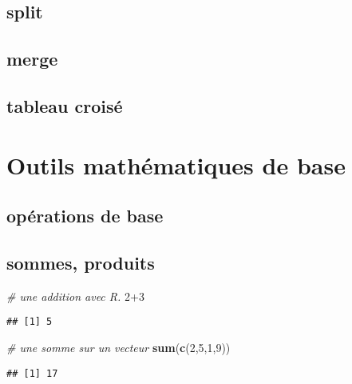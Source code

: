 \documentclass[french,]{article}
\newenvironment{Shaded}{\begin{snugshade}}{\end{snugshade}}
\newcommand{\KeywordTok}[1]{\textcolor[rgb]{0.13,0.29,0.53}{\textbf{{#1}}}}
\newcommand{\DecValTok}[1]{\textcolor[rgb]{0.00,0.00,0.81}{{#1}}}
\newcommand{\CommentTok}[1]{\textcolor[rgb]{0.56,0.35,0.01}{\textit{{#1}}}}
\newcommand{\NormalTok}[1]{{#1}}
\begin{document}
\subsection{split}\label{split}

\subsection{merge}\label{merge}

\subsection{tableau croisé}\label{tableau-croise}

\newpage

\section{Outils mathématiques de
base}\label{outils-mathematiques-de-base}

\subsection{opérations de base}\label{operations-de-base}

\subsection{sommes, produits}\label{sommes-produits}

\begin{Shaded}
\begin{Highlighting}[]
\CommentTok{# une addition avec R.}
\DecValTok{2+3}
\end{Highlighting}
\end{Shaded}

\begin{verbatim}
## [1] 5
\end{verbatim}

\begin{Shaded}
\begin{Highlighting}[]
\CommentTok{# une somme sur un vecteur}
\KeywordTok{sum}\NormalTok{(}\KeywordTok{c}\NormalTok{(}\DecValTok{2}\NormalTok{,}\DecValTok{5}\NormalTok{,}\DecValTok{1}\NormalTok{,}\DecValTok{9}\NormalTok{))}
\end{Highlighting}
\end{Shaded}

\begin{verbatim}
## [1] 17
\end{verbatim}
\end{document}
